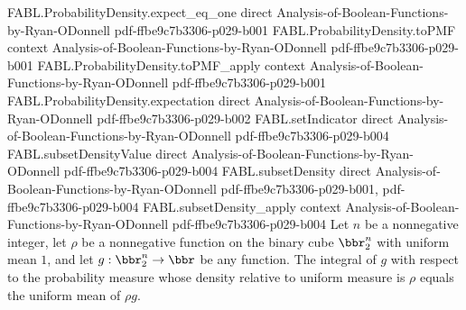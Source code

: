 \begin{theorem}
\proofstep
  {FABL.ProbabilityDensity.expect_eq_one}
  {direct}
  {Analysis-of-Boolean-Functions-by-Ryan-ODonnell}
  {pdf-ffbe9c7b3306-p029-b001}
\proofstep
  {FABL.ProbabilityDensity.toPMF}
  {context}
  {Analysis-of-Boolean-Functions-by-Ryan-ODonnell}
  {pdf-ffbe9c7b3306-p029-b001}
\proofstep
  {FABL.ProbabilityDensity.toPMF_apply}
  {context}
  {Analysis-of-Boolean-Functions-by-Ryan-ODonnell}
  {pdf-ffbe9c7b3306-p029-b001}
\proofstep
  {FABL.ProbabilityDensity.expectation}
  {direct}
  {Analysis-of-Boolean-Functions-by-Ryan-ODonnell}
  {pdf-ffbe9c7b3306-p029-b002}
\proofstep
  {FABL.setIndicator}
  {direct}
  {Analysis-of-Boolean-Functions-by-Ryan-ODonnell}
  {pdf-ffbe9c7b3306-p029-b004}
\proofstep
  {FABL.subsetDensityValue}
  {direct}
  {Analysis-of-Boolean-Functions-by-Ryan-ODonnell}
  {pdf-ffbe9c7b3306-p029-b004}
\proofstep
  {FABL.subsetDensity}
  {direct}
  {Analysis-of-Boolean-Functions-by-Ryan-ODonnell}
  {pdf-ffbe9c7b3306-p029-b001,
    pdf-ffbe9c7b3306-p029-b004}
\proofstep
  {FABL.subsetDensity_apply}
  {context}
  {Analysis-of-Boolean-Functions-by-Ryan-ODonnell}
  {pdf-ffbe9c7b3306-p029-b004}
Let $n$ be a nonnegative integer, let $\rho$ be a nonnegative function on the binary cube
$\bbr_2^n$ with uniform mean $1$, and let $g:\bbr_2^n\to\bbr$ be any function. The
integral of $g$ with respect to the probability measure whose density relative to
uniform measure is $\rho$ equals the uniform mean of $\rho g$.
\end{theorem}

